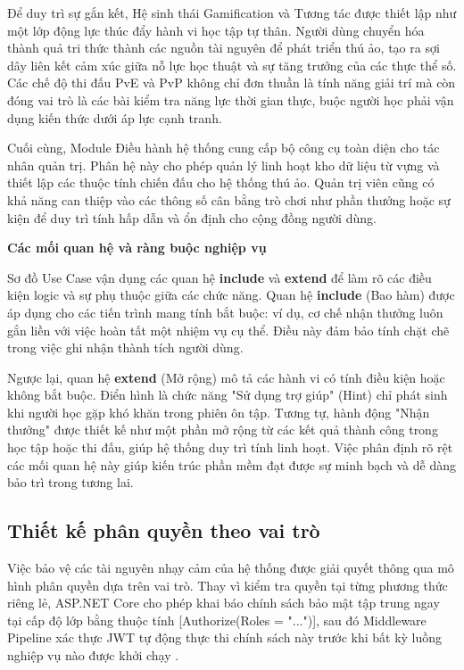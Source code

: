 Để duy trì sự gắn kết, Hệ sinh thái Gamification và Tương tác được thiết lập như một lớp động lực thúc đẩy hành vi học tập tự thân. Người dùng chuyển hóa thành quả tri thức thành các nguồn tài nguyên để phát triển thú ảo, tạo ra sợi dây liên kết cảm xúc giữa nỗ lực học thuật và sự tăng trưởng của các thực thể số. Các chế độ thi đấu PvE và PvP không chỉ đơn thuần là tính năng giải trí mà còn đóng vai trò là các bài kiểm tra năng lực thời gian thực, buộc người học phải vận dụng kiến thức dưới áp lực cạnh tranh.

Cuối cùng, Module Điều hành hệ thống cung cấp bộ công cụ toàn diện cho tác nhân quản trị. Phân hệ này cho phép quản lý linh hoạt kho dữ liệu từ vựng và thiết lập các thuộc tính chiến đấu cho hệ thống thú ảo. Quản trị viên cũng có khả năng can thiệp vào các thông số cân bằng trò chơi như phần thưởng hoặc sự kiện để duy trì tính hấp dẫn và ổn định cho cộng đồng người dùng.

\textbf{Các mối quan hệ và ràng buộc nghiệp vụ}

Sơ đồ Use Case vận dụng các quan hệ \textbf{include} và \textbf{extend} để làm rõ các điều kiện logic và sự phụ thuộc giữa các chức năng. Quan hệ \textbf{include} (Bao hàm) được áp dụng cho các tiến trình mang tính bắt buộc: ví dụ, cơ chế nhận thưởng luôn gắn liền với việc hoàn tất một nhiệm vụ cụ thể. Điều này đảm bảo tính chặt chẽ trong việc ghi nhận thành tích người dùng.

Ngược lại, quan hệ \textbf{extend} (Mở rộng) mô tả các hành vi có tính điều kiện hoặc không bắt buộc. Điển hình là chức năng "Sử dụng trợ giúp" (Hint) chỉ phát sinh khi người học gặp khó khăn trong phiên ôn tập. Tương tự, hành động "Nhận thưởng" được thiết kế như một phần mở rộng từ các kết quả thành công trong học tập hoặc thi đấu, giúp hệ thống duy trì tính linh hoạt. Việc phân định rõ rệt các mối quan hệ này giúp kiến trúc phần mềm đạt được sự minh bạch và dễ dàng bảo trì trong tương lai.

\subsection{Thiết kế phân quyền theo vai trò}

Việc bảo vệ các tài nguyên nhạy cảm của hệ thống được giải quyết thông qua mô hình phân quyền dựa trên vai trò. Thay vì kiểm tra quyền tại từng phương thức riêng lẻ, ASP.NET Core cho phép khai báo chính sách bảo mật tập trung ngay tại cấp độ lớp bằng thuộc tính [Authorize(Roles = "...")], sau đó Middleware Pipeline xác thực JWT tự động thực thi chính sách này trước khi bất kỳ luồng nghiệp vụ nào được khởi chạy \cite{MiddlewareDocs2024}.

